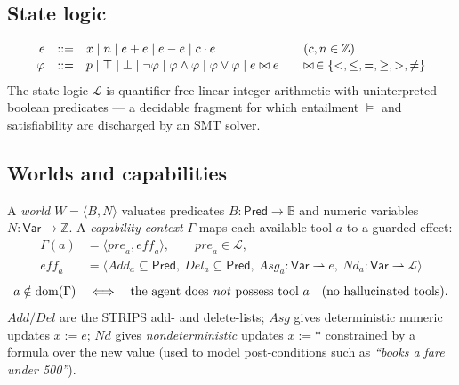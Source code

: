 \documentclass[11pt]{article}
\theoremstyle{plain}
\theoremstyle{definition}
\newcommand{\Pred}{\mathsf{Pred}}
\newcommand{\Var}{\mathsf{Var}}
\newcommand{\pre}{\mathit{pre}}
\newcommand{\eff}{\mathit{eff}}
\newcommand{\Add}{\mathit{Add}}
\newcommand{\Del}{\mathit{Del}}
\newcommand{\Asg}{\mathit{Asg}}
\newcommand{\Nd}{\mathit{Nd}}
\newcommand{\dom}{\mathrm{dom}}
\begin{document}
\subsection{State logic}
\[
\begin{array}{rcl@{\qquad}l}
e &::=& x \mid n \mid e+e \mid e-e \mid c\cdot e & (c,n\in\mathbb Z)\\[1pt]
\varphi &::=& p \mid \top \mid \bot \mid \neg\varphi \mid \varphi\wedge\varphi
  \mid \varphi\vee\varphi \mid e\bowtie e & \bowtie\,\in\{<,\le,=,\ge,>,\ne\}
\end{array}
\]
The state logic $\mathcal L$ is quantifier-free linear integer arithmetic with
uninterpreted boolean predicates --- a decidable fragment for which entailment
$\vDash$ and satisfiability are discharged by an SMT solver.

\subsection{Worlds and capabilities}
A \emph{world} $W=\langle B,N\rangle$ valuates predicates $B:\Pred\to\mathbb B$ and
numeric variables $N:\Var\to\mathbb Z$. A \emph{capability context} $\Gamma$ maps
each available tool $a$ to a guarded effect:
\begin{align*}
\Gamma(a)&=\langle \pre_a,\eff_a\rangle,\qquad \pre_a\in\mathcal L,\\
\eff_a&=\langle \Add_a\subseteq\Pred,\ \Del_a\subseteq\Pred,\
\Asg_a:\Var\rightharpoonup e,\ \Nd_a:\Var\rightharpoonup\mathcal L\rangle
\end{align*}
\[
a\notin\dom(\Gamma)\quad\Longleftrightarrow\quad\text{the agent does \emph{not}
possess tool }a\quad(\text{no hallucinated tools}).
\]
$\Add/\Del$ are the STRIPS add- and delete-lists; $\Asg$ gives deterministic
numeric updates $x:=e$; $\Nd$ gives \emph{nondeterministic} updates $x:=\ast$
constrained by a formula over the new value (used to model post-conditions such as
\emph{``books a fare under 500''}).
\end{document}
